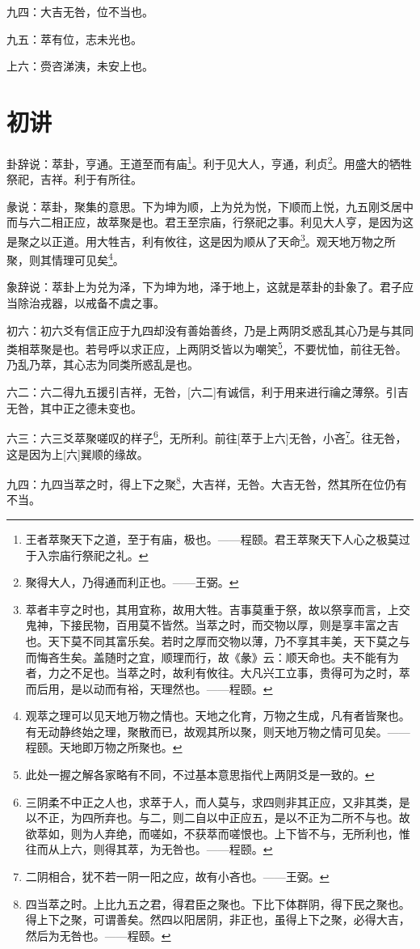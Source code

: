 \documentclass[12pt,oneside]{book}
\begin{document}
九四：大吉无咎，位不当也。

九五：萃有位，志未光也。

上六：赍咨涕洟，未安上也。

\section{初讲}
卦辞说：萃卦，亨通。王道至而有庙\footnote{王者萃聚天下之道，至于有庙，极也。——程颐。君王萃聚天下人心之极莫过于入宗庙行祭祀之礼。}。利于见大人，亨通，利贞\footnote{聚得大人，乃得通而利正也。——王弼。}。用盛大的牺牲祭祀，吉祥。利于有所往。

彖说：萃卦，聚集的意思。下为坤为顺，上为兑为悦，下顺而上悦，九五刚爻居中而与六二相正应，故萃聚是也。君王至宗庙，行祭祀之事。利见大人亨，是因为这是聚之以正道。用大牲吉，利有攸往，这是因为顺从了天命\footnote{萃者丰亨之时也，其用宜称，故用大牲。吉事莫重于祭，故以祭享而言，上交鬼神，下接民物，百用莫不皆然。当萃之时，而交物以厚，则是享丰富之吉也。天下莫不同其富乐矣。若时之厚而交物以薄，乃不享其丰美，天下莫之与而悔吝生矣。盖随时之宜，顺理而行，故《彖》云：顺天命也。夫不能有为者，力之不足也。当萃之时，故利有攸往。大凡兴工立事，贵得可为之时，萃而后用，是以动而有裕，天理然也。——程颐。}。观天地万物之所聚，则其情理可见矣\footnote{观萃之理可以见天地万物之情也。天地之化育，万物之生成，凡有者皆聚也。有无动静终始之理，聚散而已，故观其所以聚，则天地万物之情可见矣。——程颐。天地即万物之所聚也。}。

象辞说：萃卦上为兑为泽，下为坤为地，泽于地上，这就是萃卦的卦象了。君子应当除治戎器，以戒备不虞之事。

初六：初六爻有信正应于九四却没有善始善终，乃是上两阴爻惑乱其心乃是与其同类相萃聚是也。若号呼以求正应，上两阴爻皆以为嘲笑\footnote{此处一握之解各家略有不同，不过基本意思指代上两阴爻是一致的。}，不要忧恤，前往无咎。乃乱乃萃，其心志为同类所惑乱是也。

六二：六二得九五援引吉祥，无咎，[六二]有诚信，利于用来进行禴之薄祭。引吉无咎，其中正之德未变也。

六三：六三爻萃聚嗟叹的样子\footnote{三阴柔不中正之人也，求萃于人，而人莫与，求四则非其正应，又非其类，是以不正，为四所弃也。与二，则二自以中正应五，是以不正为二所不与也。故欲萃如，则为人弃绝，而嗟如，不获萃而嗟恨也。上下皆不与，无所利也，惟往而从上六，则得其萃，为无咎也。——程颐。}，无所利。前往[萃于上六]无咎，小吝\footnote{二阴相合，犹不若一阴一阳之应，故有小吝也。——王弼。}。往无咎，这是因为上[六]巽顺的缘故。

九四：九四当萃之时，得上下之聚\footnote{四当萃之时。上比九五之君，得君臣之聚也。下比下体群阴，得下民之聚也。得上下之聚，可谓善矣。然四以阳居阴，非正也，虽得上下之聚，必得大吉，然后为无咎也。——程颐。}，大吉祥，无咎。大吉无咎，然其所在位仍有不当。
\end{document}
